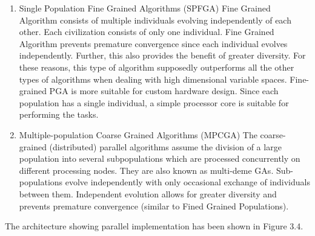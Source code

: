 \begin{enumerate}

	\item Single Population Fine Grained Algorithms (SPFGA)
	Fine Grained Algorithm consists of multiple individuals evolving independently of each other. Each civilization consists of only one individual. Fine Grained Algorithm prevents premature convergence since each individual evolves independently. Further, this also provides the benefit of greater diversity. For these reasons, this type of algorithm supposedly outperforms all the other types of algorithms when dealing with high dimensional variable spaces\cite{li2007efficient}.
	Fine-grained PGA is more suitable for custom hardware design\cite{marakeby2013analysis}. Since each population has a single individual, a simple processor core is suitable for performing the tasks.
	
	\item Multiple-population Coarse Grained Algorithms (MPCGA)
	The coarse-grained (distributed) parallel algorithms assume the division of a large population into several subpopulations which are processed concurrently on different processing nodes\cite{wahib2011optimization}. They are also known as multi-deme GAs. Sub-populations evolve independently with only occasional exchange of individuals between them. Independent evolution allows for greater diversity and prevents premature convergence (similar to Fined Grained Populations).
	

\end{enumerate}
The architecture showing parallel implementation has been shown in Figure 3.4.


